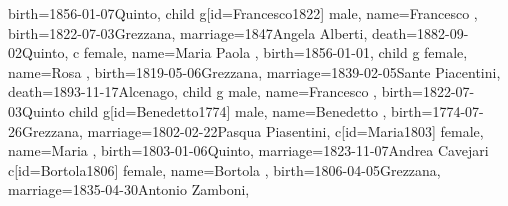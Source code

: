 \documentclass{article}
\begin{document}
\begin{midpage}
\begin{center}
\begin{genealogypicture}
{{{{{{{{{{                                        birth={1856-01-07}{Quinto},
                                    }
                                }
                            }
                            child{
                                g[id=Francesco1822]{
                                    male,
                                    name={Francesco },
                                    birth={1822-07-03}{Grezzana},
                                    marriage={1847}{Angela Alberti},
                                    death={1882-09-02}{Quinto},
                                }
                                c{
                                    female,
                                    name={Maria Paola },
                                    birth={1856-01-01}{},
                                }
                            }
                            child{
                                g{
                                    female,
                                    name={Rosa },
                                    birth={1819-05-06}{Grezzana},
                                    marriage={1839-02-05}{Sante Piacentini},
                                    death={1893-11-17}{Alcenago},
                                }
                            }
                            child{
                                g{
                                    male,
                                    name={Francesco },
                                    birth={1822-07-03}{Quinto}
                                }
                            }
                        }
                        child{
                            g[id=Benedetto1774]{
                                male,
                                name={Benedetto },
                                birth={1774-07-26}{Grezzana},
                                marriage={1802-02-22}{Pasqua Piasentini},
                            }
                            c[id=Maria1803]{
                                female,
                                name={Maria },
                                birth={1803-01-06}{Quinto},
                                marriage={1823-11-07}{Andrea Cavejari}
                            }
                            c[id=Bortola1806]{
                                female,
                                name={Bortola },
                                birth={1806-04-05}{Grezzana},
                                marriage={1835-04-30}{Antonio Zamboni},
}}}}}}}}
\end{genealogypicture}
\end{center}
\end{midpage}
\end{document}
